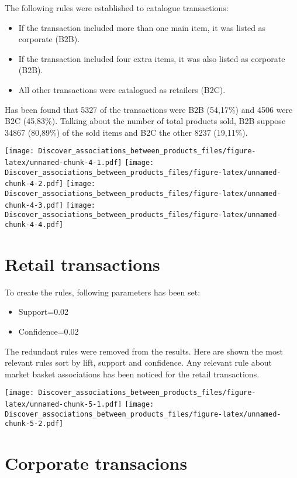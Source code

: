 \documentclass[]{article}
\providecommand{\tightlist}{%
  \setlength{\itemsep}{0pt}\setlength{\parskip}{0pt}}
\begin{document}
The following rules were established to catalogue transactions:

\begin{itemize}
\tightlist
\item
  If the transaction included more than one main item, it was listed as
  corporate (B2B).
\item
  If the transaction included four extra items, it was also listed as
  corporate (B2B).
\item
  All other transactions were catalogued as retailers (B2C).
\end{itemize}

Has been found that 5327 of the transactions were B2B (54,17\%) and 4506
were B2C (45,83\%). Talking about the number of total products sold, B2B
suppose 34867 (80,89\%) of the sold items and B2C the other 8237
(19,11\%).

\texttt{[image: Discover\_associations\_between\_products\_files/figure-latex/unnamed-chunk-4-1.pdf]}
\texttt{[image: Discover\_associations\_between\_products\_files/figure-latex/unnamed-chunk-4-2.pdf]}
\texttt{[image: Discover\_associations\_between\_products\_files/figure-latex/unnamed-chunk-4-3.pdf]}
\texttt{[image: Discover\_associations\_between\_products\_files/figure-latex/unnamed-chunk-4-4.pdf]}

\hypertarget{retail-transactions}{%
\section{Retail transactions}\label{retail-transactions}}

To create the rules, following parameters has been set:

\begin{itemize}
\tightlist
\item
  Support=0.02
\item
  Confidence=0.02
\end{itemize}

The redundant rules were removed from the results. Here are shown the
most relevant rules sort by lift, support and confidence. Any relevant
rule about market basket associations has been noticed for the retail
transactions.

\texttt{[image: Discover\_associations\_between\_products\_files/figure-latex/unnamed-chunk-5-1.pdf]}
\texttt{[image: Discover\_associations\_between\_products\_files/figure-latex/unnamed-chunk-5-2.pdf]}

\hypertarget{corporate-transacions}{%
\section{Corporate transacions}\label{corporate-transacions}}
\end{document}
